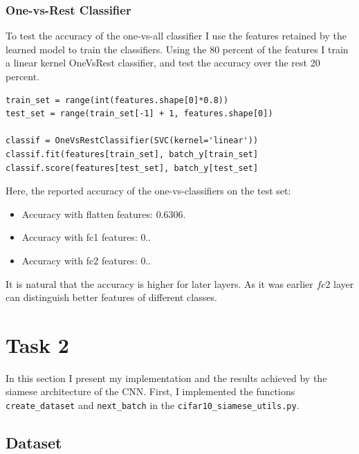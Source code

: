 \documentclass{article}
\begin{document}
\subsubsection{One-vs-Rest Classifier}


To test the accuracy of the one-vs-all classifier I use the features retained by the learned model to train the classifiers.
Using the 80 percent of the features I train a linear kernel OneVsRest classifier, and test the accuracy over the rest 20 percent.
\begin{verbatim}
train_set = range(int(features.shape[0]*0.8))
test_set = range(train_set[-1] + 1, features.shape[0])

classif = OneVsRestClassifier(SVC(kernel='linear'))
classif.fit(features[train_set], batch_y[train_set]
classif.score(features[test_set], batch_y[test_set]
\end{verbatim}
Here, the reported accuracy of the one-vs-classifiers on the test set:
\begin{itemize}
\item Accuracy with flatten features: $0.6306$.
\item Accuracy with fc1 features: $0.$.
\item Accuracy with fc2 features: $0.$.
\end{itemize}
It is natural that the accuracy is higher for later layers.
As it was earlier $fc2$ layer can distinguish better features of different classes.




\section{Task 2}

In this section I present my implementation and the results achieved by the siamese architecture of the CNN.
First, I implemented the functions \texttt{create\_dataset} and \texttt{next\_batch} in the \texttt{cifar10\_siamese\_utils.py}.


\subsection{Dataset}
\end{document}
